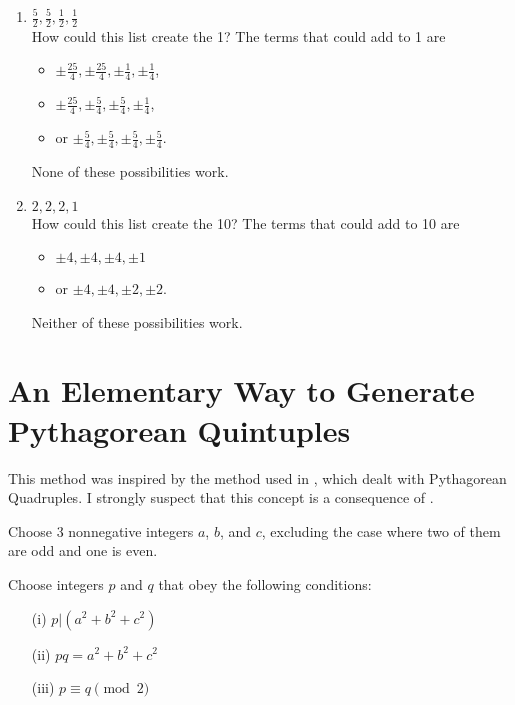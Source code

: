 \documentclass[12pt,table]{article}
\theoremstyle{definition}
\theoremstyle{remark}
\numberwithin{equation}{section}
\begin{document}
\begin{appendices}
\begin{enumerate}
\item $ \frac{5}{2},\frac{5}{2}, \frac{1}{2}, \frac{1}{2}  $\\
How could this list create the 1?
The terms that could add to 1 are
\begin{itemize}
\item$ \pm\frac{25}{4},\pm\frac{25}{4}, \pm\frac{1}{4}, \pm\frac{1}{4}  $,
\item$ \pm\frac{25}{4},\pm\frac{5}{4}, \pm\frac{5}{4}, \pm\frac{1}{4}  $,
\item or $ \pm\frac{5}{4},\pm\frac{5}{4}, \pm\frac{5}{4}, \pm\frac{5}{4}  $. 
\end{itemize}
None of these possibilities work.

\item $2,2,2,1$\\
How could this list create the 10?
The terms that could add to 10 are
\begin{itemize}
\item$ \pm4,\pm4, \pm4, \pm1  $  
\item or $ \pm4,\pm4, \pm2, \pm2  $.
\end{itemize}
Neither of these possibilities work.


\end {enumerate}


\section{An Elementary Way to Generate Pythagorean Quintuples}
\label{appendix_B}

This method was inspired by the method used in \cite{New_Path}, which 
dealt with Pythagorean Quadruples. I strongly suspect that this concept
is a consequence of \cite{Formalized_New_Path}.


Choose 3 nonnegative integers $a$, $b$, and $c$, excluding the case 
where two of them are odd and one is even.





Choose integers $p$ and $q$ that obey the following 
conditions:


\begin{itemize}
\item[(i)]
$p|(a^2 + b^2 + c^2)$ 


\item[(ii)]
$pq = a^2 + b^2 + c^2$ 



\item[(iii)]
$p \equiv q \pmod 2$




\end{itemize}
\end{appendices}
\end{document}
